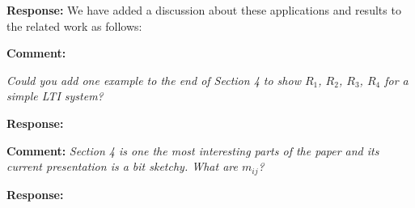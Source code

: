 \documentclass{article}
\begin{document}
\vspace{1em}
{\bf Response: }
We have added a discussion about these applications and results to the related work as follows:

\vspace{2em}
{\bf Comment: } {\itshape Could you add one example to the end of Section 4 to show $R_1$, $R_2$, $R_3$, $R_4$ for a simple LTI system? 

\vspace{1em}
{\bf Response: }


\vspace{2em}
{\bf Comment: } {\itshape 
Section 4 is one the most interesting parts
of the paper and its current presentation is a bit sketchy. What are $m_{ij}$?} } 

\vspace{1em}
{\bf Response: }





\end{document}

